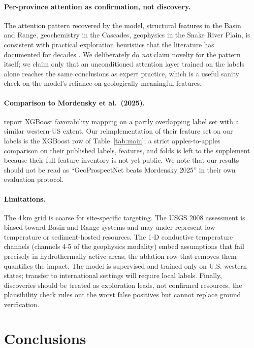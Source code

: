 \documentclass[review,12pt]{elsarticle}
\begin{document}
\paragraph{Per-province attention as confirmation, not discovery.} The attention pattern recovered by the model, structural features in the Basin and Range, geochemistry in the Cascades, geophysics in the Snake River Plain, is consistent with practical exploration heuristics that the literature has documented for decades \citep{Coolbaugh2005,Faulds2020}. We deliberately do \emph{not} claim novelty for the pattern itself; we claim only that an unconditioned attention layer trained on the labels alone reaches the same conclusions as expert practice, which is a useful sanity check on the model's reliance on geologically meaningful features.

\paragraph{Comparison to Mordensky et al.\ (2025).} \citet{Mordensky2025} report XGBoost favorability mapping on a partly overlapping label set with a similar western-US extent. Our reimplementation of their feature set on our labels is the XGBoost row of Table~\ref{tab:main}; a strict apples-to-apples comparison on their published labels, features, and folds is left to the supplement because their full feature inventory is not yet public. We note that our results should not be read as ``GeoProspectNet beats Mordensky 2025'' in their own evaluation protocol.

\paragraph{Limitations.} The 4\,km grid is coarse for site-specific targeting. The USGS 2008 assessment is biased toward Basin-and-Range systems and may under-represent low-temperature or sediment-hosted resources. The 1-D conductive temperature channels (channels 4-5 of the geophysics modality) embed assumptions that fail precisely in hydrothermally active areas; the ablation row that removes them quantifies the impact. The model is supervised and trained only on U.S. western states; transfer to international settings will require local labels. Finally, discoveries should be treated as exploration leads, not confirmed resources, the plausibility check rules out the worst false positives but cannot replace ground verification.

\section{Conclusions}
\end{document}
